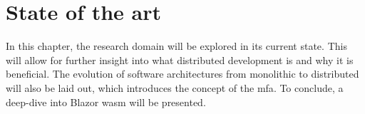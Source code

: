 
\chapter{State of the art}
\label{ch:state-of-the-art}





In this chapter, the research domain will be explored in its current state. This
will allow for further insight into what distributed development is and why it
is beneficial. The evolution of software architectures from monolithic to
distributed will also be laid out, which introduces the concept of
the \gls{mfa}. To conclude, a deep-dive into Blazor \Gls{wasm} will be presented.





